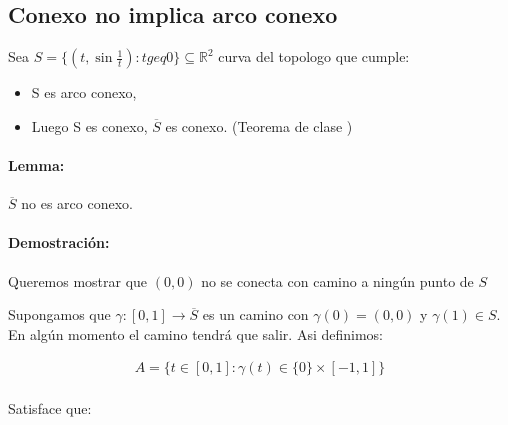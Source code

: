 
\subsection{Conexo no implica arco conexo}
Sea $S = \{(t, \sin \frac 1t): t geq 0\} \subseteq \mathbb R^2$ curva del topologo que cumple:

\begin{itemize}
    \item S es arco conexo,
    \item Luego S es conexo, $\overline S$ es conexo. (Teorema de clase )
\end{itemize}

\paragraph{Lemma:} $\overline S$ no es arco conexo.



\begin{center}
\end{center}


\paragraph{Demostración:} Queremos mostrar que $(0,0)$ no se conecta con camino a ningún punto de $S$

Supongamos que $\gamma: [0,1] \to \overline S$ es un camino con $\gamma(0) = (0,0)$ y $\gamma(1) \in S$. En algún momento el camino tendrá que salir. Asi definimos:

\begin{align*}
    A = \{t \in [0,1]: \gamma(t) \in \{0\} \times [-1,1]\} \\
\end{align*}

Satisface que:

